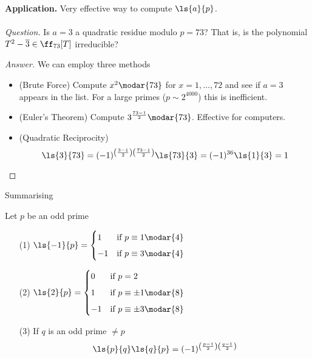 \vspace*{1em}

{\bf Application.} Very effective way to compute $\ls{a}{p}$.\\
\\
\emph{Question.} Is $a = 3$ a quadratic residue modulo $p = 73$? That is, is the polynomial $T^2 - \overline{3} \in \ff_{73}[T]$ irreducible?
\begin{proof}[Answer]
We can employ three methods
\begin{itemize}
\item (Brute Force) Compute $x^2 \modar{73}$ for $x = 1,\ldots,72$ and see if $a = 3$ appears in the list. For a large primes ($p \sim 2^{4000}$) this is inefficient.
\item (Euler's Theorem) Compute $3^{\frac{73-1}{2}}\modar{73}$. Effective for computers.
\item (Quadratic Reciprocity)
\[\ls{3}{73} = (-1)^{\left(\frac{3-1}{2}\right)\left(\frac{73-1}{2}\right)}\ls{73}{3} = (-1)^{36}\ls{1}{3} = 1\]
\end{itemize}
\end{proof}

\vspace*{1em}

Summarising
\begin{theorem}
Let $p$ be an odd prime
\begin{itemize}[itemsep=1em]
\item[(1)] $\displaystyle \ls{-1}{p} = \begin{cases}1 & \text{if $p\equiv 1 \modar{4}$}\\[0.5em] -1 & \text{if $p\equiv 3 \modar{4}$} \end{cases}$
\item[(2)] $\displaystyle \ls{2}{p} = \begin{cases}0 & \text{if $p = 2$}\\[0.5em] 1 & \text{if $p\equiv \pm 1\modar{8}$}\\[0.5em] -1 & \text{if $p\equiv \pm 3\modar{8}$} \end{cases}$
\item[(3)] If $q$ is an odd prime $\neq p$
\[\ls{p}{q}\ls{q}{p} = (-1)^{\left(\frac{p-1}{2}\right)\left(\frac{q-1}{2}\right)}\]
\end{itemize}
\end{theorem}

\vspace*{2em}

